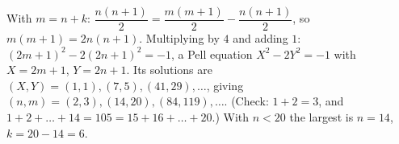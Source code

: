 With $m=n+k$: $\dfrac{n(n+1)}{2}=\dfrac{m(m+1)}{2}-\dfrac{n(n+1)}{2}$, so $m(m+1)=2n(n+1)$. Multiplying by $4$ and adding $1$: $(2m+1)^2-2(2n+1)^2=-1$, a Pell equation $X^2-2Y^2=-1$ with $X=2m+1$, $Y=2n+1$. Its solutions are $(X,Y)=(1,1),(7,5),(41,29),\dots$, giving $(n,m)=(2,3),(14,20),(84,119),\dots$. (Check: $1+2=3$, and $1+2+\dots+14=105=15+16+\dots+20$.) With $n<20$ the largest is $n=14$, $k=20-14=\boxed{6}$.

